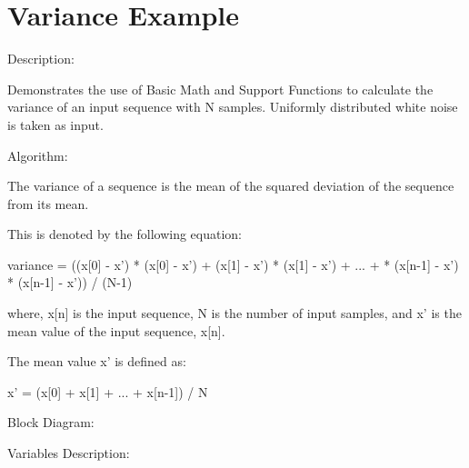 \hypertarget{group___variance_example}{\section{Variance Example}
\label{group___variance_example}
}
\begin{DoxyParagraph}{Description\-: }

\end{DoxyParagraph}
\begin{DoxyParagraph}{}
Demonstrates the use of Basic Math and Support Functions to calculate the variance of an input sequence with N samples. Uniformly distributed white noise is taken as input.
\end{DoxyParagraph}
\begin{DoxyParagraph}{Algorithm\-:}

\end{DoxyParagraph}
\begin{DoxyParagraph}{}
The variance of a sequence is the mean of the squared deviation of the sequence from its mean. 
\end{DoxyParagraph}
\begin{DoxyParagraph}{}
This is denoted by the following equation\-: 
\begin{DoxyPre} variance = ((x[0] - x') * (x[0] - x') + (x[1] - x') * (x[1] - x') + ... + * (x[n-1] - x') * (x[n-1] - x')) / (N-1)\end{DoxyPre}
 where, {\ttfamily x\mbox{[}n\mbox{]}} is the input sequence, {\ttfamily N} is the number of input samples, and {\ttfamily x'} is the mean value of the input sequence, {\ttfamily x\mbox{[}n\mbox{]}}. 
\end{DoxyParagraph}
\begin{DoxyParagraph}{}
The mean value {\ttfamily x'} is defined as\-: 
\begin{DoxyPre} x' = (x[0] + x[1] + ... + x[n-1]) / N\end{DoxyPre}

\end{DoxyParagraph}
\begin{DoxyParagraph}{Block Diagram\-:}

\end{DoxyParagraph}
\begin{DoxyParagraph}{}

\end{DoxyParagraph}
\begin{DoxyParagraph}{Variables Description\-:}

\end{DoxyParagraph}
